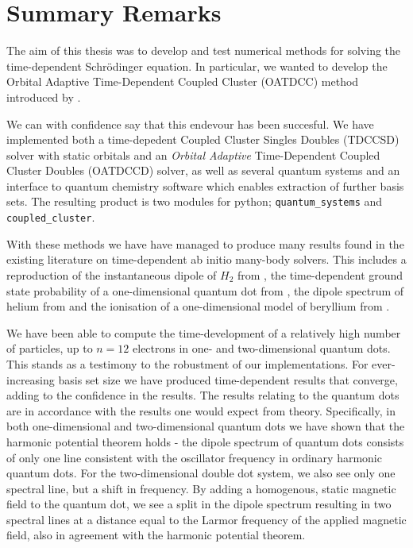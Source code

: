 \chapter{Summary Remarks}
\label{ch:conclusion}

The aim of this thesis was to develop and test numerical methods for 
solving the time-dependent Schrödinger equation. In particular, we 
wanted to develop the Orbital Adaptive Time-Dependent Coupled Cluster 
(OATDCC) method introduced by \citeauthor{kvaal2012ab}\cite{kvaal2012ab}.

We can with confidence say that this endevour has been succesful.
We have implemented both 
a time-depedent Coupled Cluster Singles Doubles (TDCCSD) solver with 
static orbitals and an \emph{Orbital Adaptive} Time-Dependent Coupled Cluster 
Doubles (OATDCCD) solver, as well as several quantum systems and an interface 
to quantum chemistry software which enables extraction of further basis sets.
The resulting product is two modules for python; \lstinline{quantum_systems} 
and \lstinline{coupled_cluster}.

With these methods we have have managed to produce 
many results found in the existing literature on time-dependent ab initio 
many-body solvers. This includes a reproduction of the instantaneous dipole 
of $H_2$ from \citeauthor{li2005time}\cite{li2005time}, the time-dependent 
ground state probability of a one-dimensional quantum dot from 
\citeauthor{Zanghellini04}\cite{Zanghellini04}, the dipole spectrum of 
helium from \citeauthor{pedersen2019symplectic}\cite{pedersen2019symplectic}
and the ionisation of a one-dimensional model of beryllium from 
\citeauthor{miyagi2013time}\cite{miyagi2013time}.

We have been able to compute the time-development 
of a relatively high number of particles, up to $n=12$ electrons in one- and
two-dimensional quantum dots. This stands as a testimony to the robustment 
of our implementations. For ever-increasing basis set size we have produced 
time-dependent results that converge, adding to the confidence in the results.
The results relating to the quantum dots are in accordance with the 
results one would expect from theory. Specifically, in both one-dimensional 
and two-dimensional quantum dots we have shown that the harmonic potential 
theorem\cite{kohn1961cyclotron} holds - the dipole spectrum of quantum 
dots consists of only one line consistent with the oscillator frequency in 
ordinary harmonic quantum dots. For the two-dimensional double dot system,
we also see only one spectral line, but a shift in frequency. By adding a homogenous,
static magnetic field to the quantum dot, we see a split in the dipole spectrum 
resulting in two spectral lines at a distance equal to the Larmor frequency of 
the applied magnetic field, also in agreement with the harmonic potential theorem.

